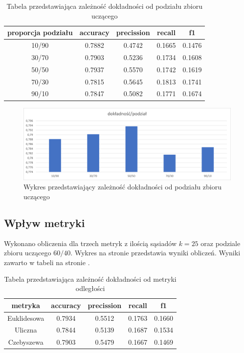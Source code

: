 \documentclass{classrep}
\begin{document}
\begin{table}[H]
\label{tdiv}
\begin{tabular}{|c|c|c|c|c|}
\hline proporcja podziału & accuracy & precission & recall & f1 \\
\hline \hline
10/90& 0.7882 & 0.4742 & 0.1665 & 0.1476 \\
30/70& 0.7903 & 0.5236 & 0.1734 & 0.1608 \\
50/50& 0.7937 & 0.5570 & 0.1742 & 0.1619 \\
70/30& 0.7815 & 0.5645 & 0.1813 & 0.1741 \\
90/10& 0.7847 & 0.5082 & 0.1771 & 0.1674\\
\end{tabular}
\caption{Tabela przedstawiająca zależność dokładności od podziału zbioru uczącego}
\end{table}




\begin{figure}[H]
\label{accuracy_div}
\includegraphics[scale=0.75]{accuracy_div}
\caption{Wykres przedstawiający zależność dokładności od podziału zbioru uczącego}
\end{figure}

\subsection{Wpływ metryki}
Wykonano obliczenia dla trzech metryk z ilością sąsiadów $k=25$ oraz podziale zbioru uczącego $60/40$. Wykres na stronie \pageref{accuracy_met} przedstawia wyniki obliczeń. Wyniki zawarto w tabeli na stronie \pageref{tmet}.

\begin{table}[H]
\label{tmet}
\begin{tabular}{|c|c|c|c|c|}
\hline metryka & accuracy & precission & recall & f1\\
\hline \hline
Euklidesowa & 0.7934 & 0.5512 & 0.1763 & 0.1660 \\
Uliczna & 0.7844 & 0.5139 & 0.1687 & 0.1534 \\
Czebyszewa & 0.7903 & 0.5479 & 0.1667  & 0.1469 \\

\end{tabular}
\caption{Tabela przedstawiająca zależność dokładności od metryki odległości}
\end{table}
\end{document}
